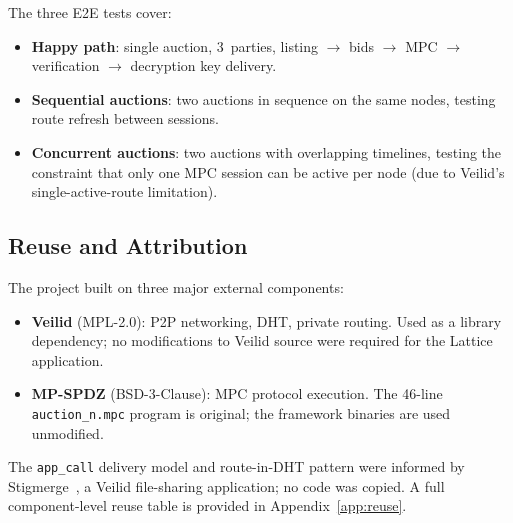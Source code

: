 The three E2E tests cover:
\begin{itemize}[noitemsep]
  \item \textbf{Happy path}: single auction, 3~parties, listing
    $\rightarrow$ bids $\rightarrow$ MPC $\rightarrow$ verification
    $\rightarrow$ decryption key delivery.
  \item \textbf{Sequential auctions}: two auctions in sequence on the same
    nodes, testing route refresh between sessions.
  \item \textbf{Concurrent auctions}: two auctions with overlapping timelines,
    testing the constraint that only one MPC session can be active per node
    (due to Veilid's single-active-route limitation).
\end{itemize}

\subsection{Reuse and Attribution}
\label{sec:method-reuse}

The project built on three major external components:
\begin{itemize}[noitemsep]
  \item \textbf{Veilid} (MPL-2.0): P2P networking, DHT, private routing.
    Used as a library dependency; no modifications to Veilid source were
    required for the Lattice application.
  \item \textbf{MP-SPDZ} (BSD-3-Clause): MPC protocol execution.  The
    46-line \texttt{auction\_n.mpc} program is original; the framework
    binaries are used unmodified.
\end{itemize}

The \texttt{app\_call} delivery model and route-in-DHT pattern were informed
by Stigmerge~\cite{stigmerge2024}, a Veilid file-sharing application; no code
was copied.  A full component-level reuse table is provided in
Appendix~\ref{app:reuse}.
